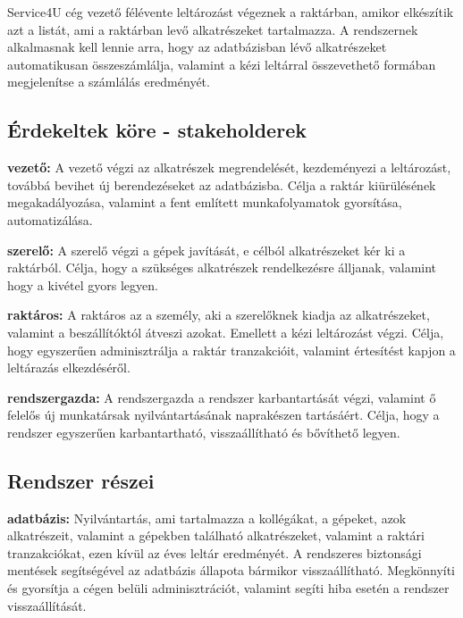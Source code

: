\documentclass[12pt]{article}\usepackage[left=20mm,right=20mm,top=14mm,bottom=20mm]{geometry}
\begin{document}
Service4U cég vezető félévente leltározást végeznek a raktárban, amikor elkészítik azt a listát, ami a
raktárban levő alkatrészeket tartalmazza.
A rendszernek alkalmasnak kell lennie arra, hogy az adatbázisban lévő alkatrészeket automatikusan összeszámlálja, valamint a kézi leltárral összevethető formában megjelenítse a számlálás eredményét.


\subsection{Érdekeltek köre - stakeholderek}
\textbf{vezető: } A vezető végzi az alkatrészek megrendelését, kezdeményezi a leltározást, továbbá bevihet új berendezéseket az adatbázisba. Célja a raktár kiürülésének megakadályozása, valamint a fent említett munkafolyamatok gyorsítása, automatizálása.
\vspace{4mm}

\noindent\textbf{szerelő: } A szerelő végzi a gépek javítását, e célból alkatrészeket kér ki a raktárból.  Célja, hogy a szükséges alkatrészek rendelkezésre álljanak, valamint hogy a kivétel gyors legyen.
\vspace{4mm}

\noindent\textbf{raktáros: } A raktáros az a személy, aki a szerelőknek kiadja az alkatrészeket, valamint a beszállítóktól átveszi azokat. Emellett a kézi leltározást végzi. Célja, hogy egyszerűen adminisztrálja a raktár tranzakcióit, valamint értesítést kapjon a leltárazás elkezdéséről.
\vspace{4mm}

\noindent\textbf{rendszergazda: } A rendszergazda a rendszer karbantartását végzi, valamint ő felelős új munkatársak nyilvántartásának naprakészen tartásáért. Célja, hogy a rendszer egyszerűen karbantartható, visszaállítható és bővíthető legyen.

\subsection{Rendszer részei}
\noindent\textbf{adatbázis: } Nyilvántartás, ami tartalmazza a kollégákat, a gépeket, azok alkatrészeit, valamint a gépekben található alkatrészeket, valamint a raktári tranzakciókat, ezen kívül az éves leltár eredményét. A rendszeres biztonsági mentések segítségével az adatbázis állapota bármikor visszaállítható. Megkönnyíti és gyorsítja a cégen belüli adminisztrációt, valamint segíti hiba esetén a rendszer visszaállítását.
\vspace{4mm}
\end{document}
